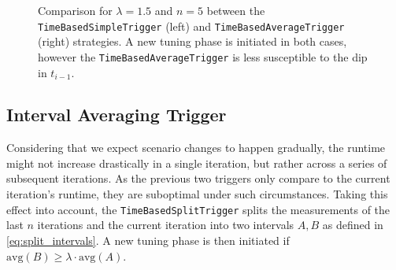 \begin{figure}[htpb]
\begin{subfigure}{0.5\textwidth}
	\end{subfigure}
	\caption{Comparison for $\lambda=1.5$ and $n=5$ between the \texttt{TimeBasedSimpleTrigger} (left) and \texttt{TimeBasedAverageTrigger} (right) strategies. A new tuning phase is initiated in both cases, however the \texttt{TimeBasedAverageTrigger} is less susceptible to the dip in $t_{i-1}$.}
	\label{fig:simple_vs_averaging}
\end{figure}

\subsection{Interval Averaging Trigger}
Considering that we expect scenario changes to happen gradually, the runtime might not increase drastically in a single iteration, but rather across a series of subsequent iterations. As the previous two triggers only compare to the current iteration's runtime, they are suboptimal under such circumstances. Taking this effect into account, the \texttt{TimeBasedSplitTrigger} splits the measurements of the last $n$ iterations and the current iteration into two intervals $A, B$ as defined in \eqref{eq:split_intervals}. A new tuning phase is then initiated if $\text{avg}(B)\ge \lambda\cdot \text{avg}(A)$.

